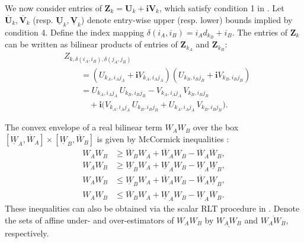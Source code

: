 \documentclass[smallextended]{svjour3}
\newcommand{\Z}{\mathbf{Z}}
\newcommand{\1}{\mathbf{1}}
\newcommand{\U}{\mathbf{U}}
\newcommand{\V}{\mathbf{V}}
\newcommand{\vi}{\mathbf{i}}
\begin{document}
We now consider entries of $\Z_k=\U_k+\vi\V_k$, which satisfy condition 1 in . Let $\overline{\U}_k,\overline{\V}_k$ (resp. $\underline{\U}_k,\underline{\V}_k$) denote entry-wise upper (resp. lower) bounds implied by condition 4. Define the index mapping $\delta(i_A,i_B)=i_A d_{k_B}+i_B$. The entries of $\Z_k$ can be written as bilinear products of entries of $\Z_{k_A}$ and $\Z_{k_B}$:
\begin{equation}
\label{eq.zk}
\begin{split}
& Z_{k,\delta(i_A,i_B),\delta(j_A,j_B)} \\
&\qquad = (U_{k_A,i_A j_A} + \vi V_{k_A,i_A j_A})(U_{k_B,i_B j_B} + \vi V_{k_B,i_B j_B}) \\
&\qquad = U_{k_A,i_A j_A}\,U_{k_B,i_B j_B} - V_{k_A,i_A j_A}\,V_{k_B,i_B j_B} \\
&\qquad\quad + \vi\bigl(V_{k_A,i_A j_A}\,U_{k_B,i_B j_B} + U_{k_A,i_A j_A}\,V_{k_B,i_B j_B}\bigr).
\end{split}
\end{equation}

The convex envelope of a real bilinear term $W_A W_B$ over the box $[\underline{W}_A,\overline{W}_A]\times[\underline{W}_B,\overline{W}_B]$ is given by McCormick inequalities \cite{mccormick1976computability}:
\begin{subequations}
\label{eq.mcccs}
\begin{align}
W_A W_B  &\ge  \overline{W}_B W_A + \overline{W}_A W_B - \overline{W}_A \overline{W}_B, \\
W_A W_B  &\ge  \underline{W}_B W_A + \underline{W}_A W_B - \underline{W}_A \underline{W}_B, \\
W_A W_B  &\le  \underline{W}_B W_A + \overline{W}_A W_B - \overline{W}_A \underline{W}_B, \\
W_A W_B  &\le  \overline{W}_B W_A + \underline{W}_A W_B - \underline{W}_A \overline{W}_B.
\end{align}
\end{subequations}
These inequalities can also be obtained via the scalar RLT procedure in \cite{sherali1992global}. Denote the sets of affine under- and over-estimators of $W_A W_B$ by $\underline{W_A W_B}$ and $\overline{W_A W_B}$, respectively.
\end{document}

